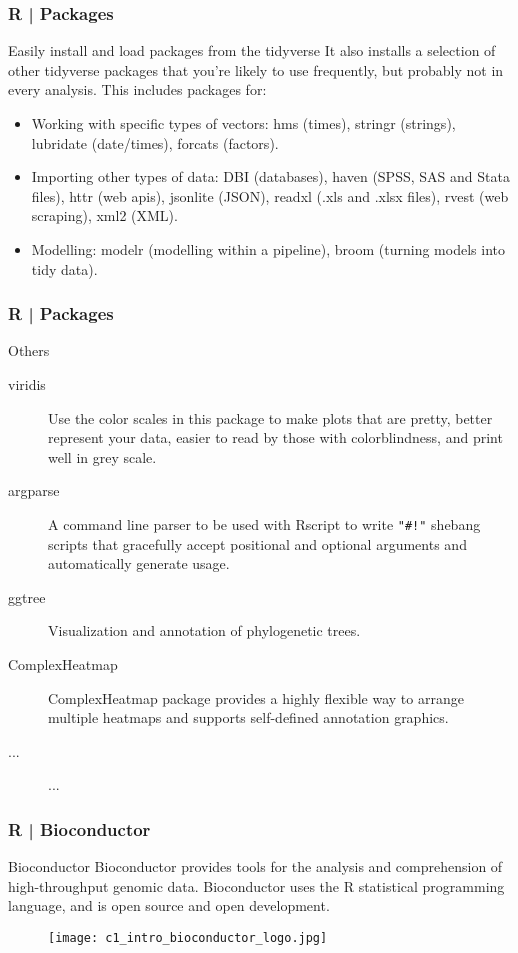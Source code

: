 \begin{frame}
  \frametitle{R | Packages}
  \begin{block}{Easily install and load packages from the tidyverse}
    It also installs a selection of other tidyverse packages that you're likely to use frequently, but probably not in every analysis. This includes packages for:
    \begin{itemize}
      \item Working with specific types of vectors: hms (times), stringr (strings), lubridate (date/times), forcats (factors).
      \item Importing other types of data: DBI (databases), haven (SPSS, SAS and Stata files), httr (web apis), jsonlite (JSON), readxl (.xls and .xlsx files), rvest (web scraping), xml2 (XML).
      \item Modelling: modelr (modelling within a pipeline), broom (turning models into tidy data).
    \end{itemize}
  \end{block}
\end{frame}

\begin{frame}[fragile]
  \frametitle{R | Packages}
  \begin{block}{Others}
    \begin{description}
      \item[viridis] Use the color scales in this package to make plots that are pretty, better represent your data, easier to read by those with colorblindness, and print well in grey scale. 
      \item[\alert{argparse}] A command line parser to be used with Rscript to write \verb|"#!"| shebang scripts that gracefully accept positional and optional \alert{arguments} and automatically generate usage.
      \item[\alert{ggtree}] Visualization and annotation of \alert{phylogenetic trees}.
      \item[\alert{ComplexHeatmap}] ComplexHeatmap package provides a highly flexible way to arrange multiple \alert{heatmaps} and supports self-defined annotation graphics. 
      \item[...] ...
    \end{description}
  \end{block}
\end{frame}

\begin{frame}
  \frametitle{R | \alert{Bioconductor}}
  \begin{block}{Bioconductor}
    Bioconductor provides tools for the analysis and comprehension of high-throughput genomic data. Bioconductor uses the R statistical programming language, and is open source and open development.
  \end{block}
  \begin{figure}
    \centering
    \texttt{[image: c1\_intro\_bioconductor\_logo.jpg]}
  \end{figure}
\end{frame}

